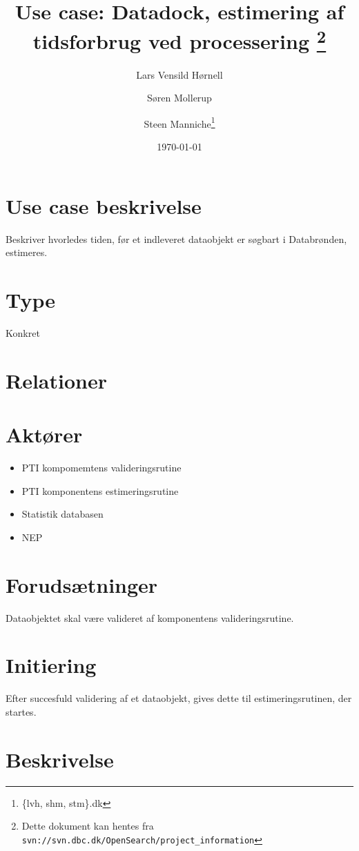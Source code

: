 \documentclass{article}
\author{Lars Vensild Hørnell \and Søren Mollerup \and Steen
  Manniche\thanks{\{lvh, shm, stm\}\@dbc.dk}}
\date{\today}
\title{Use case: Datadock, estimering af tidsforbrug ved processering \thanks{Dette dokument kan hentes fra \texttt{svn://svn.dbc.dk/OpenSearch/project\_information}}}
\begin{document}
\maketitle

\newpage

\tableofcontents

\section{Use case beskrivelse}
Beskriver hvorledes tiden, før et indleveret dataobjekt er søgbart i
Databrønden, estimeres.

\section{Type}
Konkret

\section{Relationer}

\section{Aktører}
\begin{itemize}
\item PTI kompomemtens valideringsrutine
\item PTI komponentens estimeringsrutine
\item Statistik databasen
\item NEP
\end{itemize}



\section{Forudsætninger}

Dataobjektet skal være valideret af komponentens valideringsrutine.

\section{Initiering}

Efter succesfuld validering af et dataobjekt, gives dette til
estimeringsrutinen, der startes.

\section{Beskrivelse}
\end{document}
